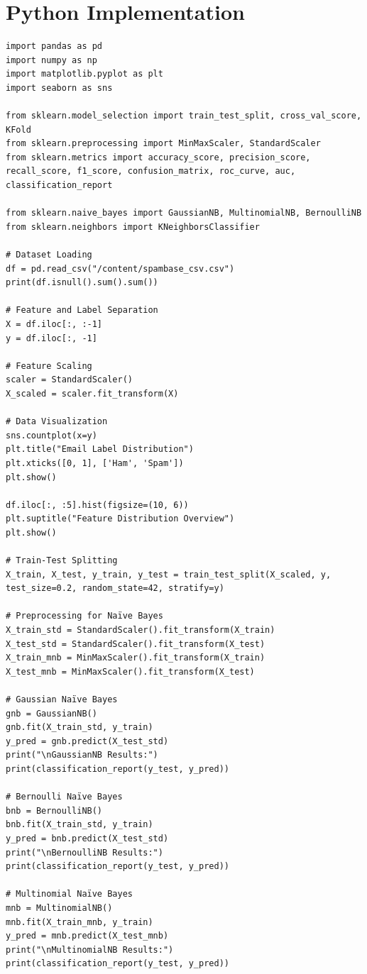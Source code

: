 \documentclass[12pt]{article}
\begin{document}
\section*{Python Implementation}
\begin{verbatim}
import pandas as pd
import numpy as np
import matplotlib.pyplot as plt
import seaborn as sns

from sklearn.model_selection import train_test_split, cross_val_score, KFold
from sklearn.preprocessing import MinMaxScaler, StandardScaler
from sklearn.metrics import accuracy_score, precision_score, recall_score, f1_score, confusion_matrix, roc_curve, auc, classification_report

from sklearn.naive_bayes import GaussianNB, MultinomialNB, BernoulliNB
from sklearn.neighbors import KNeighborsClassifier

# Dataset Loading
df = pd.read_csv("/content/spambase_csv.csv")
print(df.isnull().sum().sum())

# Feature and Label Separation
X = df.iloc[:, :-1]
y = df.iloc[:, -1]

# Feature Scaling
scaler = StandardScaler()
X_scaled = scaler.fit_transform(X)

# Data Visualization
sns.countplot(x=y)
plt.title("Email Label Distribution")
plt.xticks([0, 1], ['Ham', 'Spam'])
plt.show()

df.iloc[:, :5].hist(figsize=(10, 6))
plt.suptitle("Feature Distribution Overview")
plt.show()

# Train-Test Splitting
X_train, X_test, y_train, y_test = train_test_split(X_scaled, y, test_size=0.2, random_state=42, stratify=y)

# Preprocessing for Naïve Bayes
X_train_std = StandardScaler().fit_transform(X_train)
X_test_std = StandardScaler().fit_transform(X_test)
X_train_mnb = MinMaxScaler().fit_transform(X_train)
X_test_mnb = MinMaxScaler().fit_transform(X_test)

# Gaussian Naïve Bayes
gnb = GaussianNB()
gnb.fit(X_train_std, y_train)
y_pred = gnb.predict(X_test_std)
print("\nGaussianNB Results:")
print(classification_report(y_test, y_pred))

# Bernoulli Naïve Bayes
bnb = BernoulliNB()
bnb.fit(X_train_std, y_train)
y_pred = bnb.predict(X_test_std)
print("\nBernoulliNB Results:")
print(classification_report(y_test, y_pred))

# Multinomial Naïve Bayes
mnb = MultinomialNB()
mnb.fit(X_train_mnb, y_train)
y_pred = mnb.predict(X_test_mnb)
print("\nMultinomialNB Results:")
print(classification_report(y_test, y_pred))


\end{verbatim}
\end{document}
